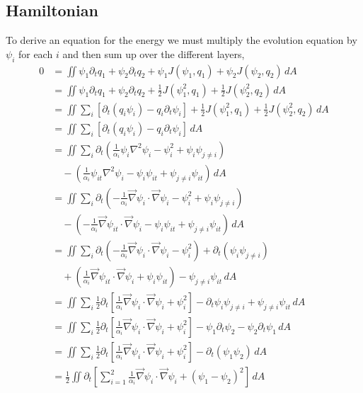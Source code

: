 \documentclass[12pt]{article}
\begin{document}
  \subsection{Hamiltonian}

    To derive an equation for the energy we must multiply the evolution equation by $\psi_i$ for each $i$ and then sum up over the different layers,
    \begin{align*}
      0 &= \iint \psi_1 \partial_t q_1 + \psi_2 \partial_t q_2 + \psi_1 J(\psi_1, q_1) + \psi_2 J(\psi_2, q_2) \, dA \\
       &= \iint \psi_1 \partial_t q_1 + \psi_2 \partial_t q_2 + \frac12 J(\psi_1^2, q_1) + \frac12 J(\psi_2^2, q_2) \, dA \\
       &= \iint \sum_i \left[\partial_t(q_i \psi_i) - q_i \partial_t\psi_i \right] + \frac12 J(\psi_1^2, q_1) + \frac12 J(\psi_2^2, q_2) \, dA \\
       &= \iint \sum_i \left[\partial_t(q_i \psi_i) - q_i \partial_t\psi_i \right] \, dA \\
       &= \iint \sum_i \partial_t \left (\frac{1}{\alpha_i}\psi_i \nabla^2 \psi_i - \psi_i^2 + \psi_i\psi_{j\ne i} \right) \\
        &\quad - \left( \frac{1}{\alpha_i} \psi_{it} \nabla^2 \psi_i - \psi_i \psi_{it} + \psi_{j \ne i} \psi_{it} \right) \, dA \\
       &= \iint \sum_i \partial_t \left (-\frac{1}{\alpha_i} \vec\nabla \psi_i \cdot \vec\nabla \psi_i - \psi_i^2 + \psi_i\psi_{j\ne i} \right) \\
        &\quad - \left( -\frac{1}{\alpha_i} \vec\nabla \psi_{it} \cdot \vec\nabla \psi_i - \psi_i \psi_{it} + \psi_{j \ne i} \psi_{it} \right) \, dA \\
       &= \iint \sum_i \partial_t \left (-\frac{1}{\alpha_i} \vec\nabla \psi_i \cdot \vec\nabla \psi_i - \psi_i^2 \right) + \partial_t (\psi_i\psi_{j\ne i})  \\
        &\quad + \left( \frac{1}{\alpha_i} \vec\nabla \psi_{it} \cdot \vec\nabla \psi_i + \psi_i \psi_{it} \right) - \psi_{j \ne i} \psi_{it} \, dA \\
       &= \iint \sum_i \frac12 \partial_t \left[ \frac{1}{\alpha_i} \vec\nabla \psi_i \cdot \vec\nabla \psi_i + \psi_i^2 \right] - \partial_t \psi_i\psi_{j\ne i} + \psi_{j \ne i} \psi_{it} \, dA \\
       &= \iint  \sum_i \frac12 \partial_t \left[ \frac{1}{\alpha_i} \vec\nabla \psi_i \cdot  \vec\nabla \psi_i + \psi_i^2 \right] - \psi_1 \partial_t \psi_2  -  \psi_2 \partial_t \psi_1\, dA \\
       &= \iint  \sum_i \frac12 \partial_t \left[ \frac{1}{\alpha_i} \vec\nabla \psi_i \cdot  \vec\nabla \psi_i + \psi_i^2 \right] -  \partial_t (\psi_1\psi_2)\, dA \\
       &= \frac12 \iint \partial_t \left[ \sum_{i=1}^2 \frac{1}{\alpha_i} \vec\nabla \psi_i \cdot \vec\nabla \psi_i + (\psi_1 - \psi_2)^2 \right]\, dA
    \end{align*}
\end{document}
